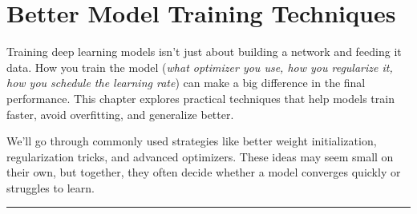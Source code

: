 \chapter{Better Model Training Techniques}

Training deep learning models isn’t just about building a network and feeding it data. How you train the model (\textit{what optimizer you use, how you regularize it, how you schedule the learning rate}) can make a big difference in the final performance. This chapter explores practical techniques that help models train faster, avoid overfitting, and generalize better.

We'll go through commonly used strategies like better weight initialization, regularization tricks, and advanced optimizers. These ideas may seem small on their own, but together, they often decide whether a model converges quickly or struggles to learn.








\vspace{30pt}
\hrule
